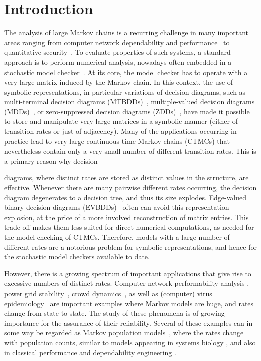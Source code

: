 \documentclass[10pt,twocolumn]{article}
\begin{document}
\section{Introduction}
\label{sec:introduction}
The analysis of large Markov chains is a
recurring challenge in many important areas ranging from computer
network dependability and performance~\cite{sand87a,haverkort-book} to
quantitative security~\cite{KopfB11}. To evaluate properties of such
systems, a standard approach is to perform numerical analysis,
nowadays often embedded in a stochastic model
checker~\cite{KNP11,KatoenZHHJ11,CiardoMW09,DeavoursCCDDDSW02}. At its
core, the model checker has to operate with a very large matrix
induced by the Markov chain. In this context, the use of symbolic
representations, in particular variations of decision diagrams, such
as multi-terminal decision
diagrams (MTBDDs)~\cite{Parker02,HermannsKNPS03}, multiple-valued decision diagrams (MDDs)~\cite{WanCM11}, or
zero-suppressed decision diagrams (ZDDs)~\cite{LampkaSOB10}, have made it possible to store and manipulate
very large matrices in a symbolic manner (either of
transition rates or just of adjacency). Many of the applications
occurring in practice lead to very large continuous-time Markov chains
(CTMCs) that nevertheless contain only a very small number of
different transition rates. This is a primary reason why decision

diagrams, where distinct rates are stored as distinct values in the
structure, are effective. Whenever there are many pairwise different
rates occurring, the decision diagram degenerates to a decision tree,
and thus its size explodes. Edge-valued binary decision
diagrams (EVBDDs)~\cite{LaiPV96} often can avoid this representation
explosion, at the price of a more involved reconstruction of matrix
entries. This trade-off makes them less suited for direct numerical
computations, as needed for the model checking of CTMCs. Therefore,
models with a large number of different rates are a
notorious problem for symbolic representations, and hence for the
stochastic model checkers available to date.

However, there is a growing spectrum of important applications that
give rise to excessive numbers of distinct rates.
Computer network performability analysis \cite{HaverkortHK00,ClothH05,BaierHHHK12,DBLP:journals/sqj/GokhaleLT04,DBLP:books/daglib/0079988},
power grid stability~\cite{DBLP:conf/nca/Sanders12,wsc12},
crowd dynamics~\cite{MassinkLBHH12,MassinkLBH11},
as well as (computer) virus epidemiology~\cite{XuLZ12,ZEB+11,YA11}
are important examples where Markov models are huge, and rates change
from state to state. The study of these phenomena is of growing
importance for the assurance of their reliability. Several
of these examples can in some way be regarded as Markov population
models~\cite{HenzingerJW11,HillstonTG12},
where the rates change with population counts, similar to models
appearing in systems biology \cite{MateescuWDH10}, and also in classical performance and
dependability engineering \cite{HaverkortHK00,ClothH05}.
\end{document}
